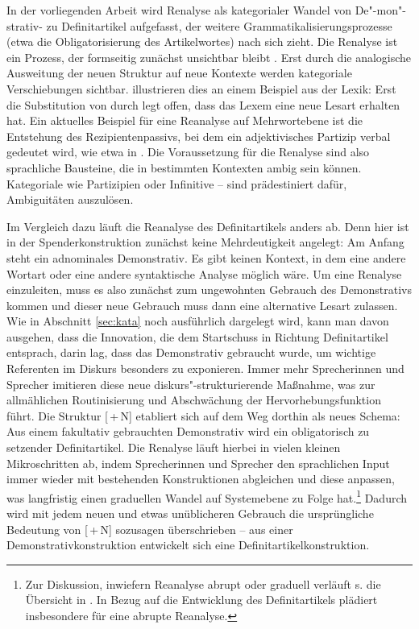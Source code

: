 In der vorliegenden Arbeit wird Renalyse als kategorialer Wandel von De"-mon"-strativ- zu Definitartikel aufgefasst, der weitere Grammatikalisierungsprozesse (etwa die Obligatorisierung des Artikelwortes) nach sich zieht. Die Renalyse ist ein Prozess, der formseitig zunächst unsichtbar bleibt \parencite[58]{Langacker1977}. Erst durch die analogische Ausweitung der neuen Struktur auf neue Kontexte werden kategoriale Verschiebungen sichtbar. \textcite[50]{Hopper2006} illustrieren dies an einem Beispiel aus der Lexik: Erst die Substitution von  durch  legt offen, dass das Lexem  eine neue Lesart \parencite[urspr. ][389]{Kluge2011} erhalten hat. Ein aktuelles Beispiel für eine Reanalyse auf Mehrwortebene ist die Entstehung des Rezipientenpassivs, bei dem ein adjektivisches Partizip verbal gedeutet wird, wie etwa in  \parencite[152f.]{Szczepaniak2011a}.
Die Voraussetzung für die Renalyse sind also sprachliche Bausteine, die in bestimmten Kontexten ambig sein können. Kategoriale  wie Partizipien oder Infinitive \parencite[vgl. die Renalyse des -Progressivs -- aus einem nominalen wird ein verbaler Infinitiv, s.][]{Flick2013} -- sind prädestiniert dafür, Ambiguitäten auszulösen. 

Im Vergleich dazu läuft die Reanalyse des Definitartikels anders ab. Denn hier ist in der Spenderkonstruktion zunächst keine Mehrdeutigkeit angelegt: Am Anfang steht  ein adnominales Demonstrativ. Es gibt keinen Kontext, in dem eine andere Wortart oder eine andere syntaktische Analyse möglich wäre. Um eine Renalyse einzuleiten, muss es also zunächst zum ungewohnten Gebrauch des Demonstrativs kommen und dieser neue Gebrauch muss dann eine alternative Lesart zulassen. Wie in Abschnitt \ref{sec:kata} noch ausführlich dargelegt wird, kann man davon ausgehen, dass die Innovation, die dem Startschuss in Richtung Definitartikel entsprach, darin lag, dass das Demonstrativ  gebraucht wurde, um wichtige Referenten im Diskurs besonders zu exponieren. Immer mehr Sprecherinnen und Sprecher imitieren diese neue diskurs"-strukturierende Maßnahme, was zur allmählichen Routinisierung und Abschwächung der Hervorhebungsfunktion führt. Die Struktur [\,+\,N] etabliert sich auf dem Weg dorthin als neues Schema: Aus einem fakultativ gebrauchten Demonstrativ wird ein obligatorisch zu setzender Definitartikel. Die Renalyse läuft hierbei in vielen kleinen Mikroschritten ab, indem Sprecherinnen und Sprecher den sprachlichen Input immer wieder mit bestehenden Konstruktionen abgleichen und diese anpassen, was langfristig einen graduellen Wandel auf Systemebene zu Folge hat.\footnote{Zur Diskussion, inwiefern Reanalyse abrupt oder graduell verläuft s. die Übersicht in \textcite[75]{Traugott2013}. In Bezug auf die Entwicklung des Definitartikels plädiert insbesondere \textcite{Schlachter2015} für eine abrupte Reanalyse.} 
Dadurch wird mit jedem neuen und etwas unüblicheren Gebrauch die ursprüngliche Bedeutung von [\,+\,N] sozusagen überschrieben -- aus einer Demonstrativkonstruktion entwickelt sich eine Definitartikelkonstruktion.

